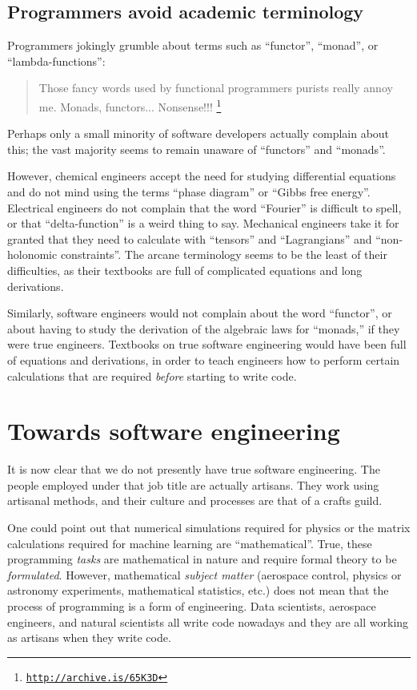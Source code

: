 \subsection{Programmers avoid academic terminology }

Programmers jokingly grumble about terms such as ``functor'', ``monad'',
or ``lambda-functions'':
\begin{quote}
{\small{}Those fancy words used by functional programmers purists
really annoy me. Monads, functors... Nonsense!!! }\footnote{\texttt{\href{http://archive.is/65K3D}{http://archive.is/65K3D}}}
\end{quote}
Perhaps only a small minority of software developers actually complain
about this; the vast majority seems to remain unaware of ``functors''
and ``monads''.

However, chemical engineers accept the need for studying differential
equations and do not mind using the terms ``phase diagram'' or ``Gibbs
free energy''. Electrical engineers do not complain that the word
``Fourier'' is difficult to spell, or that ``delta-function''
is a weird thing to say. Mechanical engineers take it for granted
that they need to calculate with ``tensors'' and ``Lagrangians''
and ``non-holonomic constraints''. The arcane terminology seems
to be the least of their difficulties, as their textbooks are full
of complicated equations and long derivations.

Similarly, software engineers would not complain about the word ``functor'',
or about having to study the derivation of the algebraic laws for
``monads,'' \textemdash{} if they were true engineers. Textbooks
on true software engineering would have been full of equations and
derivations, in order to teach engineers how to perform certain calculations
that are required \emph{before} starting to write code.

\section{Towards software engineering }

It is now clear that we do not presently have true software engineering.
The people employed under that job title are actually artisans. They
work using artisanal methods, and their culture and processes are
that of a crafts guild.

One could point out that numerical simulations required for physics
or the matrix calculations required for machine learning are ``mathematical''.
True, these programming \emph{tasks} are mathematical in nature and
require formal theory to be \emph{formulated}. However, mathematical
\emph{subject matter} (aerospace control, physics or astronomy experiments,
mathematical statistics, etc.) does not mean that the process of programming
is a form of engineering. Data scientists, aerospace engineers, and
natural scientists all write code nowadays \textemdash{} and they
are all working as artisans when they write code.

